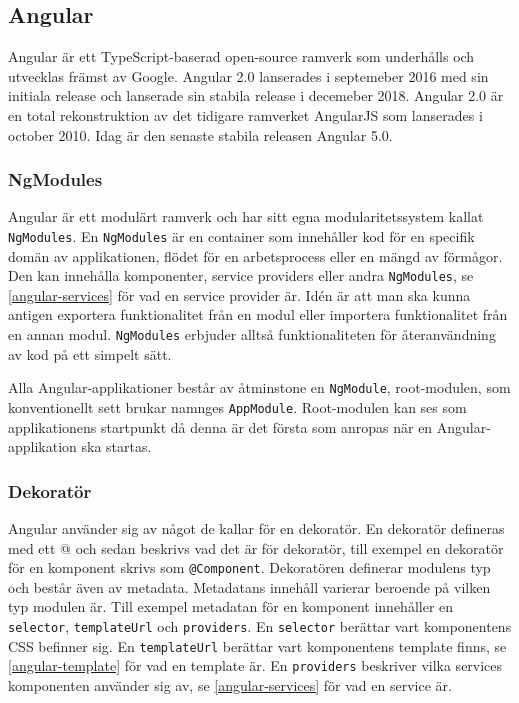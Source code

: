 \subsection{Angular}
Angular är ett TypeScript-baserad open-source ramverk som underhålls och utvecklas främst av Google. Angular 2.0 lanserades i septemeber 2016 med sin initiala release och lanserade sin stabila release i decemeber 2018. Angular 2.0 är en total rekonstruktion av det tidigare ramverket AngularJS som lanserades i october 2010. Idag är den senaste stabila releasen Angular 5.0. \cite{angular-date}

\subsubsection{NgModules}
Angular är ett modulärt ramverk och har sitt egna modularitetssystem kallat \texttt{NgModules}.\cite{angular-architecture} En \texttt{NgModules} är en container som innehåller kod för en specifik domän av applikationen, flödet för en arbetsprocess eller en mängd av förmågor. Den kan innehålla komponenter, service providers eller andra \texttt{NgModules}, se \ref{angular-services} för vad en service provider är. Idén är att man ska kunna antigen exportera funktionalitet från en modul eller importera funktionalitet från en annan modul. \texttt{NgModules} erbjuder alltså funktionaliteten för återanvändning av kod på ett simpelt sätt. 

Alla Angular-applikationer består av åtminstone en \texttt{NgModule}, root-modulen, som konventionellt sett brukar namnges \texttt{AppModule}.\cite{angular-modules} Root-modulen kan ses som applikationens startpunkt då denna är det första som anropas när en Angular-applikation ska startas.



\subsubsection{Dekoratör}
Angular använder sig av något de kallar för en dekoratör. En dekoratör defineras med ett @ och sedan beskrivs vad det är för dekoratör, till exempel en dekoratör för en komponent skrivs som \texttt{@Component}.\cite{angular-modules} Dekoratören definerar modulens typ och består även av metadata. Metadatans innehåll varierar beroende på vilken typ modulen är. Till exempel metadatan för en komponent innehåller en \texttt{selector}, \texttt{templateUrl} och \texttt{providers}. En \texttt{selector} berättar vart komponentens CSS befinner sig. En \texttt{templateUrl} berättar vart komponentens template finns, se \ref{angular-template} för vad en template är. En \texttt{providers} beskriver vilka services komponenten använder sig av, se \ref{angular-services} för vad en service är. \cite{angular-components}

